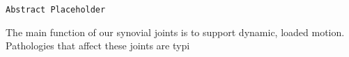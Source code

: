 \texttt{Abstract Placeholder}

The main function of our synovial joints is to support dynamic, loaded motion. Pathologies that affect these joints are typi